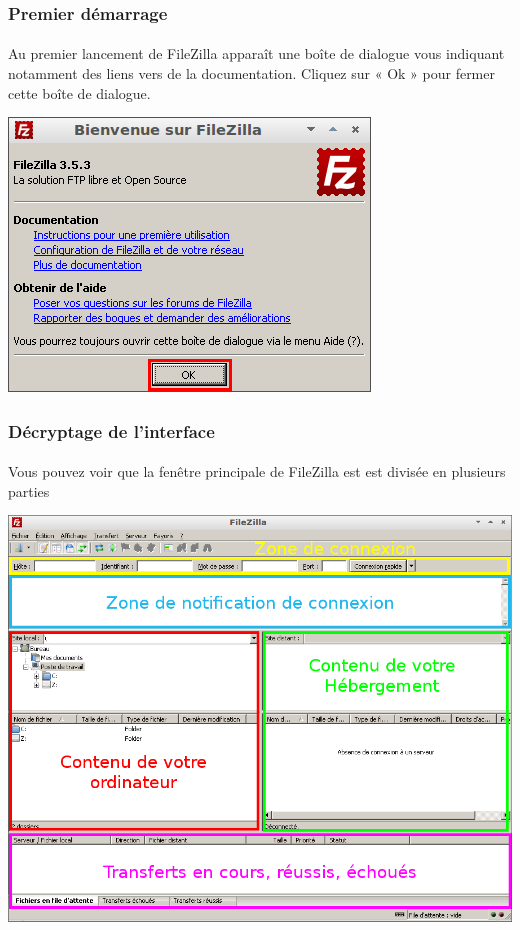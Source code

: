 \documentclass[10pt,a4paper]{article}
\begin{document}
\subsubsection{Premier démarrage}
\paragraph{}Au premier lancement de FileZilla apparaît une boîte de dialogue vous indiquant notamment des liens vers de la documentation. Cliquez sur « Ok » pour fermer cette boîte de dialogue.
\begin{center}
\includegraphics[scale=0.4]{img/0029.png}
\end{center}
\subsubsection{Décryptage de l'interface}
\paragraph{}Vous pouvez voir que la fenêtre principale de FileZilla est est divisée en plusieurs parties
\begin{center}
\includegraphics[scale=0.4]{img/0030.png}
\end{center}
\end{document}
